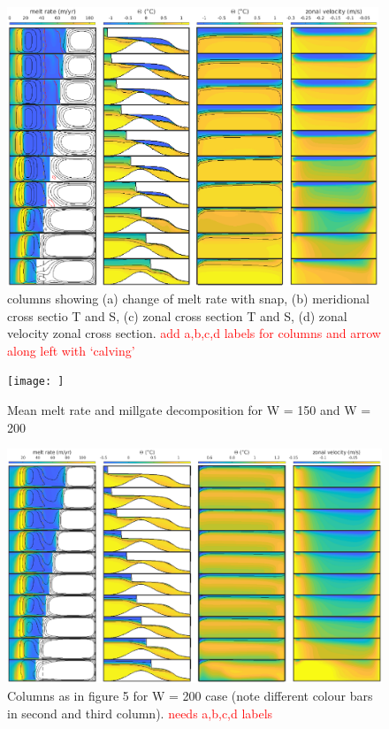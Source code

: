 \documentclass[draft]{agujournal2019}
\newcommand{\red}[1]{\textcolor{red}{#1}}
\begin{document}
\begin{figure}
    \centering
    \includegraphics[width = 0.99\textwidth]{../make_figures/plots/figure5.eps}
    \caption{columns showing (a) change of melt rate with snap, (b) meridional cross sectio T and S, (c) zonal cross section T and S, (d) zonal velocity zonal cross section. \red{add a,b,c,d labels for columns and arrow along left with `calving'}}
    \label{fig:fig5}
\end{figure}

\begin{figure}
    \centering
    \texttt{[image: ]}
    \caption{Mean melt rate and millgate decomposition for W = 150 and W = 200}
    \label{fig:figure6}
\end{figure}

\begin{figure}
    \centering
    \includegraphics{../make_figures/plots/figure7.eps}
    \caption{Columns as in figure 5 for W = 200 case (note different colour bars in second and third column). \red{needs a,b,c,d labels}}
    \label{fig:figure7}
\end{figure}
\end{document}

